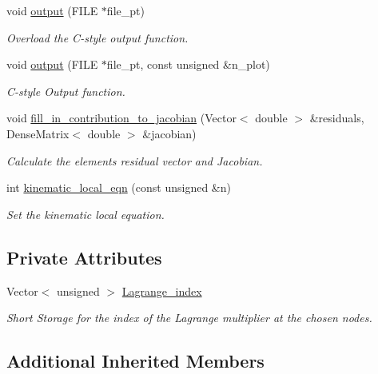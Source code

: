\begin{DoxyCompactItemize}
void \hyperlink{classoomph_1_1ElasticPointFluidInterfaceBoundingElement_a61782633205934c9af1aead51640e220}{output} (F\+I\+LE $\ast$file\+\_\+pt)
\begin{DoxyCompactList}\small\item\em Overload the C-\/style output function. \end{DoxyCompactList}\item 
void \hyperlink{classoomph_1_1ElasticPointFluidInterfaceBoundingElement_a4b30d56cc1869b5c9c4819843fb65ecc}{output} (F\+I\+LE $\ast$file\+\_\+pt, const unsigned \&n\+\_\+plot)
\begin{DoxyCompactList}\small\item\em C-\/style Output function. \end{DoxyCompactList}\item 
void \hyperlink{classoomph_1_1ElasticPointFluidInterfaceBoundingElement_a87802dab899430374a926d1e1bf3d90b}{fill\+\_\+in\+\_\+contribution\+\_\+to\+\_\+jacobian} (Vector$<$ double $>$ \&residuals, Dense\+Matrix$<$ double $>$ \&jacobian)
\begin{DoxyCompactList}\small\item\em Calculate the element\textquotesingle{}s residual vector and Jacobian. \end{DoxyCompactList}\item 
int \hyperlink{classoomph_1_1ElasticPointFluidInterfaceBoundingElement_ac3d7ce3db705bee219bf56cbb0d9ba92}{kinematic\+\_\+local\+\_\+eqn} (const unsigned \&n)
\begin{DoxyCompactList}\small\item\em Set the kinematic local equation. \end{DoxyCompactList}\end{DoxyCompactItemize}
\subsection*{Private Attributes}
\begin{DoxyCompactItemize}
\item 
Vector$<$ unsigned $>$ \hyperlink{classoomph_1_1ElasticPointFluidInterfaceBoundingElement_a6ba345f9959aa12708c3ef8598327bc2}{Lagrange\+\_\+index}
\begin{DoxyCompactList}\small\item\em Short Storage for the index of the Lagrange multiplier at the chosen nodes. \end{DoxyCompactList}\end{DoxyCompactItemize}
\subsection*{Additional Inherited Members}


